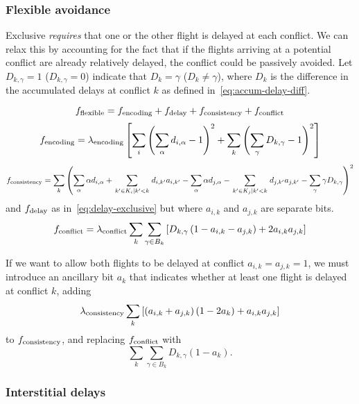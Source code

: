 \subsubsection{Flexible avoidance}
Exclusive \emph{requires} that one or the other flight is delayed at each conflict.
We can relax this by accounting for the fact that if the flights arriving at a potential conflict are already relatively delayed, the conflict could be passively avoided.
Let $D_{k, \gamma} = 1$ ($D_{k, \gamma} = 0$) indicate that $D_k = \gamma$ ($D_k \neq \gamma$), where $D_k$ is the difference in the accumulated delays at conflict $k$ as defined in~\eqref{eq:accum-delay-diff}.

\begin{equation}
f_{\mathrm{flexible}}
=
f_{\mathrm{encoding}} +
f_{\mathrm{delay}} +
f_{\mathrm{consistency}} + 
f_{\mathrm{conflict}}
\end{equation}
\begin{equation}
f_{\mathrm{encoding}}
=
\lambda_{\mathrm{encoding}}
\left[
  \sum_i {\left(\sum_{\alpha} d_{i, \alpha} - 1\right)}^2
  +
  \sum_{k}
  {\left(\sum_{\gamma} D_{k, \gamma} - 1\right)}^2
\right]
\end{equation}
\begin{equation}
f_{\mathrm{consistency}}
=
\sum_k
{\left( 
\sum_{\alpha} \alpha d_{i, \alpha} +
\sum_{\left. k' \in K_i \middle| k' < k\right.}
d_{i, k'} a_{i, k'}
-
\sum_{\alpha} \alpha d_{j, \alpha} -
\sum_{\left. k' \in K_j \middle| k' < k\right.}
d_{j, k'} a_{j, k'}
-
\sum_{\gamma} \gamma D_{k, \gamma}
\right)}^2
\end{equation}
and $f_{\mathrm{delay}}$ as in~\eqref{eq:delay-exclusive} but where $a_{i,k}$ and $a_{j, k}$ are separate bits.
\begin{equation}
f_{\mathrm{conflict}}
=
\lambda_{\mathrm{conflict}}
\sum_k \sum_{\gamma \in B_k} 
\left[
D_{k, \gamma}
\left(1 - a_{i, k} - a_{j, k}\right)
+ 2 a_{i, k} a_{j, k}
\right]
\end{equation}

If we want to allow both flights to be delayed at conflict $a_{i,k} = a_{j, k} = 1$, we must introduce an ancillary bit $a_k$ that indicates whether at least one flight is delayed at conflict $k$, adding
\begin{equation}
  \lambda_{\mathrm{consistency}}
  \sum_{k} 
  \left[
    \left(a_{i, k} + a_{j, k} \right) \left(1 - 2 a_k\right)
    + a_{i, k} a_{j, k}
  \right]
\end{equation}
to $f_{\mathrm{consistency}}$, and
replacing $f_{\mathrm{conflict}}$ with
\begin{equation}
\sum_k \sum_{\gamma \in B_k} D_{k, \gamma} (1 - a_k).
\end{equation}

\subsubsection{Interstitial delays}

